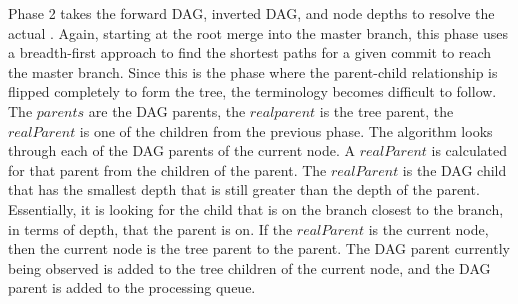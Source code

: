 Phase 2 takes the forward DAG, inverted DAG, and node depths to resolve
the actual \mt{}. Again, starting at the root merge into the master
branch, this phase uses a breadth-first approach to find the shortest
paths for a given commit to reach the master branch. Since this is the
phase where the parent-child relationship is flipped completely to form
the tree, the terminology becomes difficult to follow. The $parents$ are
the DAG parents, the $realparent$ is the tree parent, the $realParent$
is one of the children from the previous phase. The algorithm looks
through each of the DAG parents of the current node. A $realParent$ is
calculated for that parent from the children of the parent. The
$realParent$ is the DAG child that has the smallest depth that is still
greater than the depth of the parent. Essentially, it is looking for the
child that is on the branch closest to the branch, in terms of depth,
that the parent is on. If the $realParent$ is the current node, then the
current node is the tree parent to the parent. The DAG parent currently
being observed is added to the tree children of the current node, and
the DAG parent is added to the processing queue. 
